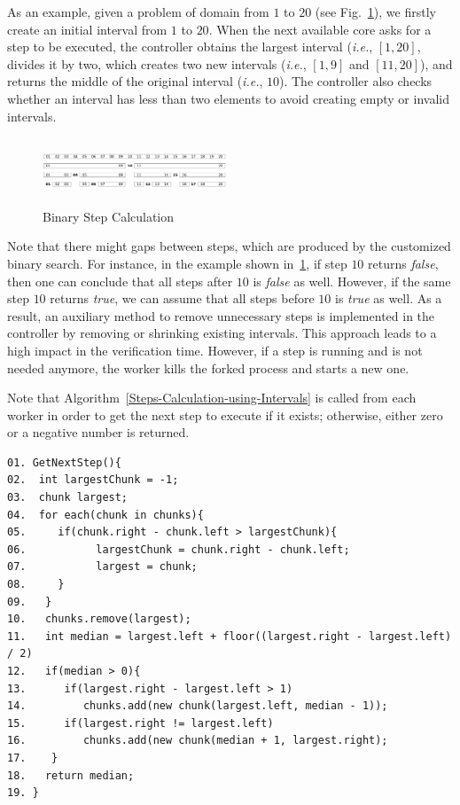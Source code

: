 As an example, given a problem of domain from $1$ to $20$ (see Fig.~\ref{Binary-Step-Calculation}), we firstly create an initial interval from $1$ to $20$. When the next available core asks for a step to be executed, the controller obtains the largest interval ({\it i.e.}, $\left[1,20\right]$, divides it by two, which creates two new intervals ({\it i.e.}, $\left[1,9\right]$ and $\left[11,20\right]$), and returns the middle of the original interval ({\it i.e.}, $10$). The controller also checks whether an interval has less than two elements to avoid creating empty or invalid intervals.
%
\begin{figure}[ht]
	\centering
  \includegraphics[width=0.49\textwidth, height=75px]{Image/Fig4.png}
	\caption{Binary Step Calculation}
	\label{Binary-Step-Calculation}
\end{figure}

Note that there might gaps between steps, which are produced by the customized binary search. For instance, in the example shown in~\ref{Binary-Step-Calculation}, if step $10$ returns \textit{false}, then one can conclude that all steps after $10$ is \textit{false} as well. However, if the same step $10$ returns \textit{true}, we can assume that all steps before $10$ is \textit{true} as well. As a result, an auxiliary method to remove unnecessary steps is implemented in the controller by removing or shrinking existing intervals. This approach leads to a high impact in the verification time. However, if a step is running and is not needed anymore, the worker kills the forked process and starts a new one.

Note that Algorithm~\ref{Steps-Calculation-using-Intervals} is called from each worker in order to get the next step to execute if it exists; otherwise, either zero or a negative number is returned.

\begin{lstlisting}[caption=Steps Calculation using Intervals,label=Steps-Calculation-using-Intervals]
01. GetNextStep(){
02.  int largestChunk = -1;
03.  chunk largest;
04.  for each(chunk in chunks){
05.     if(chunk.right - chunk.left > largestChunk){
06.           largestChunk = chunk.right - chunk.left;
07.           largest = chunk;
08.     }
09.   }	
10.   chunks.remove(largest);	
11.   int median = largest.left + floor((largest.right - largest.left) / 2)
12.   if(median > 0){
13.      if(largest.right - largest.left > 1)
14.         chunks.add(new chunk(largest.left, median - 1));	
15.      if(largest.right != largest.left)
16.         chunks.add(new chunk(median + 1, largest.right);
17.    }
18.   return median;
19. }
\end{lstlisting}

